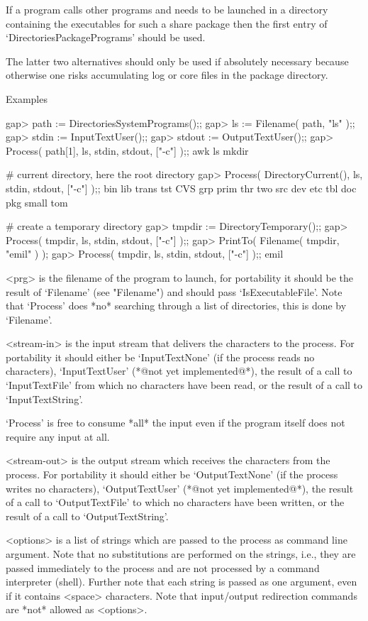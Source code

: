 If a program calls other programs and needs to be launched in a directory
containing the executables for such a share package then  the first entry of
`DirectoriesPackagePrograms' should be used.

The latter  two alternatives should only  be used if absolutely necessary
because otherwise one risks accumulating log or core files in the package
directory.

Examples

\beginexample
gap> path := DirectoriesSystemPrograms();;
gap> ls := Filename( path, "ls" );;
gap> stdin := InputTextUser();;
gap> stdout := OutputTextUser();;
gap> Process( path[1], ls, stdin, stdout, ["-c"] );;
awk    ls     mkdir

# current directory, here the root directory
gap> Process( DirectoryCurrent(), ls, stdin, stdout, ["-c"] );;
bin    lib    trans  tst    CVS    grp    prim   thr    two
src    dev    etc    tbl    doc    pkg    small  tom

# create a temporary directory
gap> tmpdir := DirectoryTemporary();;                          
gap> Process( tmpdir, ls, stdin, stdout, ["-c"] );;            
gap> PrintTo( Filename( tmpdir, "emil" ) );
gap> Process( tmpdir, ls, stdin, stdout, ["-c"] );;
emil
\endexample

<prg> is the filename of the program to launch, for portability it should
be   the  result  of   `Filename'   (see   "Filename") and   should  pass
`IsExecutableFile'.  Note that  `Process'  does *no* searching through  a
list of directories, this is done by `Filename'.

<stream-in>  is the  input stream   that  delivers the characters  to the
process.   For portability it  should either  be `InputTextNone' (if  the
process reads  no characters), `InputTextUser' (*@not yet implemented@*),
the  result  of a call to `InputTextFile'  from which  no characters have
been read, or the result of a call to `InputTextString'.

`Process' is  free to consume *all* the  input even if the program itself
does not require any input at all.

<stream-out> is the output stream  which receives the characters from the
process.  For portability it should   either be `OutputTextNone' (if  the
process writes no characters), `OutputTextUser' (*@not yet implemented@*),
the result of a call to `OutputTextFile' to which no characters have been
written, or the result of a call to `OutputTextString'.

<options> is a list of strings which are passed to the process as command
line argument.  Note that no substitutions are  performed on the strings,
i.e., they are passed immediately to the process and are not processed by
a command interpreter (shell).   Further note that  each string is passed
as one  argument,  even if it  contains  <space>  characters.  Note  that
input/output redirection commands are *not* allowed as <options>.

